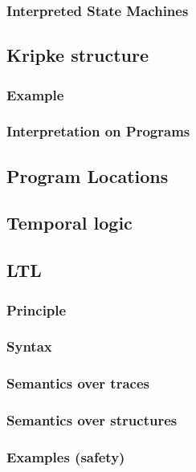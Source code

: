 \documentclass[12pt, a4paper]{book}
\begin{document}
  \subsubsection{Interpreted State Machines}
  \label{subs:Interpreted State Machines}
  \subsection{Kripke structure}
  \label{sub:Kripke structure}
  \subsubsection{Example}
  \label{subs:Example}
  \subsubsection{Interpretation on Programs}
  \label{subs:Interpretation on Programs}
  \subsection{Program Locations}
  \label{sub:Program Locations}
  \subsection{Temporal logic}
  \label{sub:Temporal logic}
  \subsection{LTL}
  \label{sub:LTL}
  \subsubsection{Principle}
  \label{subs:Principle}
  \subsubsection{Syntax}
  \label{subs:Syntax}
  \subsubsection{Semantics over traces}
  \label{subs:Semantics over traces}
  \subsubsection{Semantics over structures}
  \label{subs:Semantics over structures}
  \subsubsection{Examples (safety)}
  \label{subs:Examples (safety)}
\end{document}
